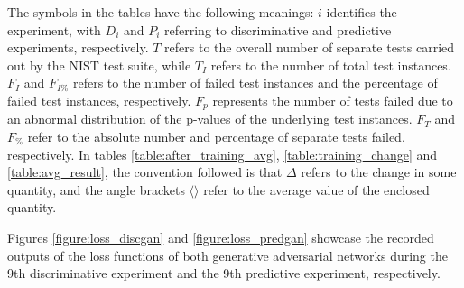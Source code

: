 \documentclass[12pt, titlepage]{report}
\theoremstyle{definition}
\begin{document}
The symbols in the tables have the following meanings: $i$ identifies the experiment, with $D_i$ and $P_i$ referring to discriminative and predictive experiments, respectively. $T$ refers to the overall number of separate tests carried out by the NIST test suite, while $T_I$ refers to the number of total test instances. $F_I$ and $F_{I\%}$ refers to the number of failed test instances and the percentage of failed test instances, respectively. $F_p$ represents the number of tests failed due to an abnormal distribution of the p-values of the underlying test instances. $F_T$ and $F_{\%}$ refer to the absolute number and percentage of separate tests failed, respectively. In tables \ref{table:after_training_avg}, \ref{table:training_change} and \ref{table:avg_result}, the convention followed is that $\Delta$ refers to the change in some quantity, and the angle brackets $\langle \rangle$ refer to the average value of the enclosed quantity.

Figures \ref{figure:loss_discgan} and \ref{figure:loss_predgan} showcase the recorded outputs of the loss functions of both generative adversarial networks during the 9th discriminative experiment and the 9th predictive experiment, respectively.
\end{document}

